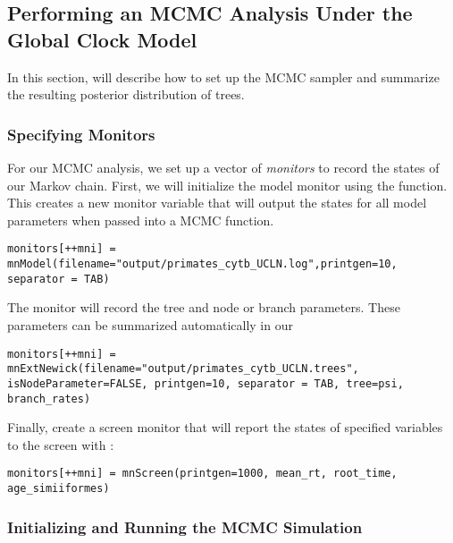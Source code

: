 \bigskip
\subsection{Performing an MCMC Analysis Under the Global Clock Model}

In this section, will describe how to set up the MCMC sampler and summarize the resulting posterior distribution of trees. 

\subsubsection{Specifying Monitors}

For our MCMC analysis, we set up a vector of \textit{monitors} to record the states of our Markov chain. 
First, we will initialize the model monitor using the  function. 
This creates a new monitor variable that will output the states for all model parameters when passed into a MCMC function. 
{\tt \begin{snugshade*}
\begin{lstlisting}
monitors[++mni] = mnModel(filename="output/primates_cytb_UCLN.log",printgen=10, separator = TAB)
\end{lstlisting}
\end{snugshade*}}

The  monitor will record the tree and node or branch parameters.
These parameters can be summarized automatically in our 
{\tt \begin{snugshade*}
\begin{lstlisting}
monitors[++mni] = mnExtNewick(filename="output/primates_cytb_UCLN.trees", isNodeParameter=FALSE, printgen=10, separator = TAB, tree=psi, branch_rates)
\end{lstlisting}
\end{snugshade*}}

Finally, create a screen monitor that will report the states of specified variables to the screen with :
{\tt \begin{snugshade*}
\begin{lstlisting}
monitors[++mni] = mnScreen(printgen=1000, mean_rt, root_time, age_simiiformes)
\end{lstlisting}
\end{snugshade*}}

\subsubsection{Initializing and Running the MCMC Simulation}

